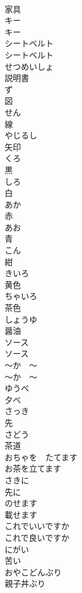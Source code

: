 \documentclass[8pt]{extreport}
\begin{document}
\begin{CJK}{UTF8}{min}
\\	家具	
\\	キー	
\\	キー	
\\	シートベルト	
\\	シートベルト	
\\	せつめいしょ	
\\	説明書	
\\	ず	
\\	図	
\\	せん	
\\	線	
\\	やじるし	
\\	矢印		
\\	くろ	
\\	黒		
\\	しろ	
\\	白		
\\	あか	
\\	赤		
\\	あお	
\\	青	
\\	こん	
\\	紺		
\\	きいろ	
\\	黄色		
\\	ちゃいろ	
\\	茶色		
\\	しょうゆ	
\\	醤油	
\\	ソース	
\\	ソース	
\\	〜か　〜	
\\	〜か　〜		
\\	ゆうべ	
\\	夕べ	
\\	さっき	
\\	先	
\\	さどう	
\\	茶道		
\\	おちゃを　たてます	
\\	お茶を立てます		
\\	さきに	
\\	先に		
\\	のせます	
\\	載せます		
\\	これでいいですか	
\\	これで良いですか		
\\	にがい	
\\	苦い		
\\	おやこどんぶり	
\\	親子丼ぶり		

\end{CJK}
\end{document}

